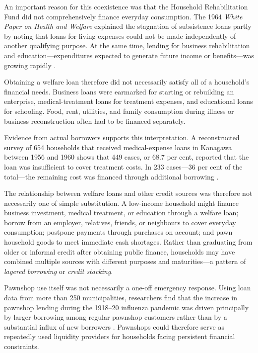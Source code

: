 \documentclass[12pt,a4paper]{article}
\begin{document}
An important reason for this coexistence was that the Household Rehabilitation Fund did not comprehensively finance everyday consumption. The 1964 \emph{White Paper on Health and Welfare} explained the stagnation of subsistence loans partly by noting that loans for living expenses could not be made independently of another qualifying purpose. At the same time, lending for business rehabilitation and education---expenditures expected to generate future income or benefits---was growing rapidly \citep{MinistryofHealthandWelfare1964}.

Obtaining a welfare loan therefore did not necessarily satisfy all of a household's financial needs. Business loans were earmarked for starting or rebuilding an enterprise, medical-treatment loans for treatment expenses, and educational loans for schooling. Food, rent, utilities, and family consumption during illness or business reconstruction often had to be financed separately.

Evidence from actual borrowers supports this interpretation. A reconstructed survey of 654 households that received medical-expense loans in Kanagawa between 1956 and 1960 shows that 449 cases, or 68.7 per cent, reported that the loan was insufficient to cover treatment costs. In 233 cases---36 per cent of the total---the remaining cost was financed through additional borrowing \citep{Sakai2023}.

The relationship between welfare loans and other credit sources was therefore not necessarily one of simple substitution. A low-income household might finance business investment, medical treatment, or education through a welfare loan; borrow from an employer, relatives, friends, or neighbours to cover everyday consumption; postpone payments through purchases on account; and pawn household goods to meet immediate cash shortages. Rather than graduating from older or informal credit after obtaining public finance, households may have combined multiple sources with different purposes and maturities---a pattern of \emph{layered borrowing} or \emph{credit stacking}.

Pawnshop use itself was not necessarily a one-off emergency response. Using loan data from more than 250 municipalities, researchers find that the increase in pawnshop lending during the 1918--20 influenza pandemic was driven principally by larger borrowing among regular pawnshop customers rather than by a substantial influx of new borrowers \citep{Inoue2021}. Pawnshops could therefore serve as repeatedly used liquidity providers for households facing persistent financial constraints.
\end{document}

